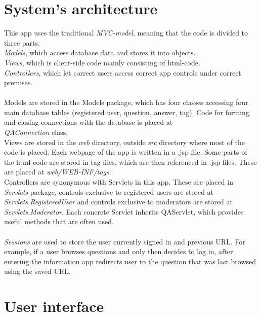 \documentclass[a4paper,12pt]{article}
\begin{document}
\section{System's architecture}
This app uses the traditional \emph{MVC-model}, meaning that the code is divided to three parts:\\
\emph{Models}, which access database data and stores it into objects.\\
\emph{Views}, which is client-side code mainly consisting of html-code.\\
\emph{Controllers}, which let correct users access correct app controls under correct premises.\\
\\
Models are stored in the Models package, which has four classes accessing four main database tables (registered user, question, answer, tag). Code for forming and closing connections with the database is placed at \\ \emph{QAConnection} class.\\
Views are stored in the \emph{web} directory, outside \emph{src} directory where most of the code is placed. Each webpage of the app is written in a .jsp file. Some parts of the html-code are stored in tag files, which are then referenced in .jsp files. These are placed at \emph{web/WEB-INF/tags}.\\
Controllers are synonymous with Servlets in this app. These are placed in \emph{Servlets} package, controls exclusive to registered users are stored at \\
\emph{Servlets.RegisteredUser} and controls exclusive to moderators are stored at \emph{Servlets.Moderator}. Each concrete Servlet inherits QAServlet, which provides useful methods that are often used.\\
\\
\emph{Sessions} are used to store the user currently signed in and previous URL. For example, if a user browses questions and only then decides to log in, after entering the information app redirects user to the question that was last browsed using the saved URL.
\newpage

\section{User interface}
\end{document}
